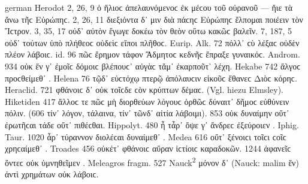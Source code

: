 \begin{otherlanguage*}{german}
Herodot 2, 26, 9 ὁ ἥλιοϲ  ἀπελαυνόμενοϲ ἐκ μέϲου τοῦ οὐρανοῦ — ἤιε  τὰ ἄνω τῆϲ Εὐρώπηϲ. 2, 26, 11 διεξιόντα δ᾽  μιν διὰ πάϲηϲ Εὐρώπηϲ ἔλπομαι ποιέειν  τὸν Ἴϲτρον. 3, 35, 17 οὐδ᾽  αὐτὸν ἔγωγε δοκέω τὸν θεὸν οὕτω  κακῶϲ βαλεῖν. 7, 187, 5 οὐδ᾽  τούτων ὑπὸ πλήθεοϲ οὐδεὶϲ  εἴποι πλῆθοϲ. Eurip. Alk. 72 πόλλ᾽  ϲὺ λέξαϲ οὐδὲν  πλέον λάβοιϲ. id. 96 πῶϲ  ἔρημον τάφον Ἄδμητοϲ κεδνῆϲ  ἔπραξε γυναικόϲ. Androm. 934 οὐκ  ἔν γ᾽ ἐμοῖϲ δόμοιϲ βλέπουϲ᾽  αὐγὰϲ τἄμ᾽ ἐκαρποῦτ᾽  λέχη. Hekabe 742 ἄλγοϲ  προϲ\-θεί\-μεθ᾽ . Helena 76 τῷδ᾽  εὐϲτόχῳ πτερῷ ἀπόλαυϲιν εἰκοῦϲ ἔθανεϲ  Διὸϲ κόρηϲ. Heraclid. 721 φθάνοιϲ δ᾽  οὐκ  τοῖϲδε ϲὸν κρύπτων δέμαϲ. (Vgl. hiezu Elmsley). Hiketiden 417 ἄλλοϲ τε πῶϲ  μὴ διορθεύων λόγουϲ ὀρθῶϲ δύναιτ᾽  δῆμοϲ εὐθύνειν πόλιν. (606 τίν᾽  λόγον, τάλαινα, τίν᾽  τῶνδ᾽ αἰτία λάβοιμι). 853 οὐκ  δυναίμην οὔτ᾽ ἐρωτῆϲαι τάδε οὔτ᾽  πιθέϲθαι. Hippolyt. 480 ἦ τἆρ᾽  ὄψε γ᾽ ἄνδρεϲ ἐξεύροιεν . Iphig. Taur. 1020 ἆρ᾽  τύραννον διολέϲαι δυναίμεθ᾽ . Medea 616 οὔτ᾽  ξένοιϲι τοῖϲι ϲοῖϲ χρηϲαίμεθ᾽ . Troades 456 οὐκέτ᾽  φθάνοιϲ  αὔραν ἱϲτίοιϲ καραδοκῶν. 1244 ἀφανεῖϲ  ὄντεϲ οὐκ  ὑμνηθεῖμεν . Meleagros fragm. 527 Nauck\textsuperscript{2} μόνον δ᾽  (Nauck: malim ἕν) ἀντὶ χρημάτων οὐκ  λάβοιϲ.


\end{otherlanguage*}
